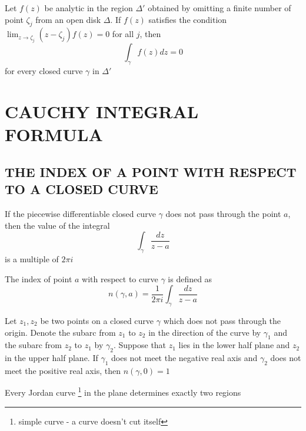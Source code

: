 \documentclass{report}
\begin{document}
\begin{theorem}
    Let $f(z)$ be analytic in the region $\Delta'$ obtained by omitting a finite number of point $\zeta_j$ from an open disk $\Delta$. If $f(z)$ satisfies the condition $\lim_{z \to \zeta_j} (z - \zeta_j) f(z) = 0$ for all $j$, then 
    \[
        \int_{\gamma} f(z) dz = 0
    \]
    for every closed curve $\gamma$ in $\Delta'$
\end{theorem}

\section{CAUCHY INTEGRAL FORMULA}

\subsection{THE INDEX OF A POINT WITH RESPECT TO A CLOSED CURVE}

\begin{lemma}
    If the piecewise differentiable closed curve $\gamma$ does not pass through the point $a$, then the value of the integral
    \[
        \int_\gamma \frac{dz}{z - a}
    \]
    is a multiple of $2\pi i$
\end{lemma}

\begin{definition}
    The index of point $a$ with respect to curve $\gamma$ is defined as
    \[
        n(\gamma, a) = \frac{1}{2 \pi i} \int_\gamma \frac{dz}{z - a}
    \]
\end{definition}

\begin{lemma}
    Let $z_1, z_2$ be two points on a closed curve $\gamma$ which does not pass through the origin. Denote the subarc from $z_1$ to $z_2$ in the direction of the curve by $\gamma_1$ and the subarc from $z_2$ to $z_1$ by $\gamma_2$. Suppose that $z_1$ lies in the lower half plane and $z_2$ in the upper half plane. If $\gamma_1$ does not meet the negative real axis and $\gamma_2$ does not meet the positive real axis, then $n(\gamma, 0) = 1$
\end{lemma}

\begin{theorem}
    Every Jordan curve \footnote{simple curve - a curve doesn't cut itself} in the plane determines exactly two regions
\end{theorem}
\end{document}
